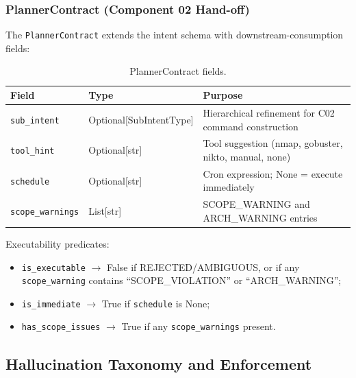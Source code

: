 \documentclass[10pt,journal,onecolumn]{IEEEtran}
\begin{document}
\subsubsection{PlannerContract (Component 02 Hand-off)}
The \texttt{PlannerContract} extends the intent schema with downstream-consumption fields:
\begin{table}[h]
\caption{PlannerContract fields.}
\label{tab:plannercontract}
\begin{tabularx}{\columnwidth}{>{\ttfamily}l l X}
\toprule
\textbf{Field} & \textbf{Type} & \textbf{Purpose}\\
\midrule
\texttt{sub\_intent} & Optional[SubIntentType] & Hierarchical refinement for C02 command construction\\
\texttt{tool\_hint} & Optional[str] & Tool suggestion (nmap, gobuster, nikto, manual, none)\\
\texttt{schedule} & Optional[str] & Cron expression; None = execute immediately\\
\texttt{scope\_warnings} & List[str] & SCOPE\_WARNING and ARCH\_WARNING entries\\
\bottomrule
\end{tabularx}
\end{table}

Executability predicates:
\begin{itemize}
\item \texttt{is\_executable} $\rightarrow$ False if REJECTED/AMBIGUOUS, or if any \texttt{scope\_warning} contains ``SCOPE\_VIOLATION'' or ``ARCH\_WARNING'';
\item \texttt{is\_immediate} $\rightarrow$ True if \texttt{schedule} is None;
\item \texttt{has\_scope\_issues} $\rightarrow$ True if any \texttt{scope\_warnings} present.
\end{itemize}

\subsection{Hallucination Taxonomy and Enforcement}
\end{document}
